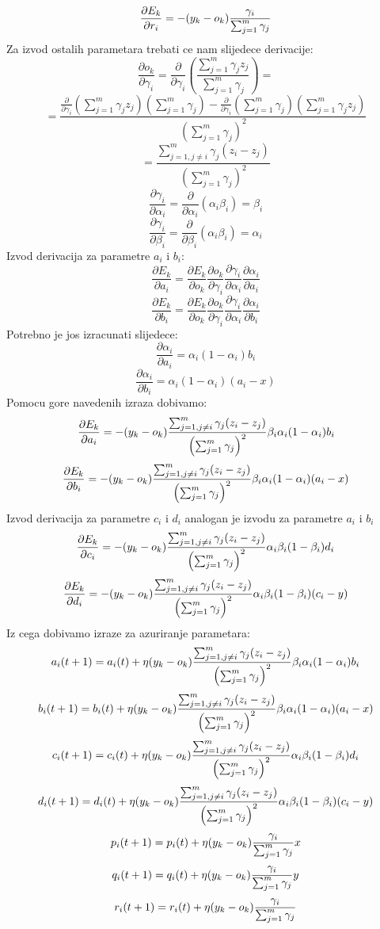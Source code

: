 \documentclass[a4paper, 11pt]{article}
\begin{document}
$$\frac{\partial E_{k}}{\partial r_{i}}=-(y_{k}-o_{k})\frac{\gamma_{i}}{\sum_{j=1}^{m}\gamma_{j}}$$
Za izvod ostalih parametara trebati ce nam slijedece derivacije:
\newcommand{\upperr}{\sum_{j=1}^{m}\gamma_{j}z_{j}}
\newcommand{\lowerr}{\sum_{j=1}^{m}\gamma_{j}}
$$\frac{\partial o_{k}}{\partial\gamma_{i}} = \frac{\partial}{\partial\gamma_{i}}\left (\frac{\upperr}{\lowerr}\right )=$$
$$= \frac{\frac{\partial}{\partial\gamma_{i}}\left (\upperr\right )\left(\lowerr\right)-\frac{\partial}{\partial\gamma_{i}}\left (\lowerr\right )\left(\upperr\right)}{\left(\lowerr\right)^{2}}$$
\newcommand{\dokdgamma}{ \frac{\sum_{j=1,j\neq i}^{m}\gamma_{j}(z_{i}-z_{j})}{\left(\lowerr\right)^{2}}}
\newcommand{\dgammadalpha}{ \beta_{i}}
\newcommand{\dgammadbeta}{\alpha_{i}}
$$=\dokdgamma$$
$$\frac{\partial \gamma_{i}}{\partial\alpha_{i}} = \frac{\partial}{\partial\alpha_{i}}\left(\alpha_{i}\beta_{i}\right)= \dgammadalpha$$
$$\frac{\partial \gamma_{i}}{\partial\beta_{i}} = \frac{\partial}{\partial\beta_{i}}\left(\alpha_{i}\beta_{i}\right)= \dgammadbeta$$
Izvod derivacija za parametre $a_{i}$ i $b_{i}$:
$$\frac{\partial E_{k}}{\partial a_{i}}=\frac{\partial E_{k}}{\partial o_{k}}\frac{\partial o_{k}}{\partial \gamma_{i}}\frac{\partial \gamma_{i}}{\partial \alpha_{i}}\frac{\partial \alpha_{i}}{\partial a_{i}}$$
$$\frac{\partial E_{k}}{\partial b_{i}}=\frac{\partial E_{k}}{\partial o_{k}}\frac{\partial o_{k}}{\partial \gamma_{i}}\frac{\partial \gamma_{i}}{\partial \alpha_{i}}\frac{\partial \alpha_{i}}{\partial b_{i}}$$
Potrebno je jos izracunati slijedece:
\newcommand{\sigmoidalphad}{\alpha_{i}(1-\alpha_{i})}
\newcommand{\dalphada}{\sigmoidalphad b_{i}}
\newcommand{\dalphadb}{\sigmoidalphad (a_{i}-x)}
\newcommand{\sigmoidbetad}{\beta_{i}(1-\beta_{i})}
\newcommand{\dbetadc}{\sigmoidbetad d_{i}}
\newcommand{\dbetadd}{\sigmoidbetad (c_{i}-y)}
$$\frac{\partial \alpha_{i}}{\partial a_{i}} = \dalphada$$
$$\frac{\partial \alpha_{i}}{\partial b_{i}} = \dalphadb$$
Pomocu gore navedenih izraza dobivamo:
$$\frac{\partial E_{k}}{\partial a_{i}}=-\minusdEkdok \dokdgamma \dgammadalpha \dalphada$$
$$\frac{\partial E_{k}}{\partial b_{i}}=-\minusdEkdok \dokdgamma \dgammadalpha \dalphadb$$
Izvod derivacija za parametre $c_{i}$ i $d_{i}$ analogan je izvodu za parametre $a_{i}$ i $b_{i}$ 
$$\frac{\partial E_{k}}{\partial c_{i}}=-\minusdEkdok \dokdgamma \dgammadbeta \dbetadc$$
$$\frac{\partial E_{k}}{\partial d_{i}}=-\minusdEkdok \dokdgamma \dgammadbeta \dbetadd$$
Iz cega dobivamo izraze za azuriranje parametara:
$$a_{i}(t+1) =a_{i}(t)+\eta\minusdEkdok \dokdgamma \dgammadalpha \dalphada$$
$$b_{i}(t+1) =b_{i}(t)+\eta\minusdEkdok \dokdgamma \dgammadalpha \dalphadb$$
$$c_{i}(t+1) =c_{i}(t)+\eta\minusdEkdok \dokdgamma \dgammadbeta \dbetadc$$
$$d_{i}(t+1) =d_{i}(t)+\eta\minusdEkdok \dokdgamma \dgammadbeta \dbetadd	$$
$$p_{i}(t+1) =p_{i}(t)+\eta(y_{k}-o_{k})\frac{\gamma_{i}}{\sum_{j=1}^{m}\gamma_{j}} x$$
$$q_{i}(t+1) =q_{i}(t)+\eta(y_{k}-o_{k})\frac{\gamma_{i}}{\sum_{j=1}^{m}\gamma_{j}} y$$
$$r_{i}(t+1) =r_{i}(t)+\eta(y_{k}-o_{k})\frac{\gamma_{i}}{\sum_{j=1}^{m}\gamma_{j}} $$
\end{document}
